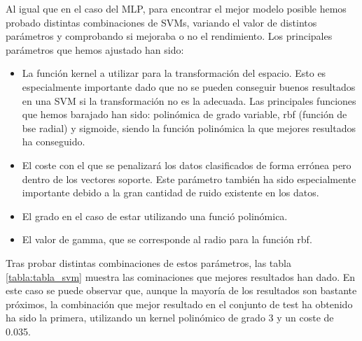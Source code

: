 \documentclass[journal,twoside]{JoPhA}
\begin{document}
	Al igual que en el caso del MLP, para encontrar el mejor modelo posible hemos probado distintas combinaciones de SVMs, variando el valor de distintos parámetros y comprobando si mejoraba o no el rendimiento. Los principales parámetros que hemos ajustado han sido: \\
	
	\begin{itemize} 
		\item La función kernel a utilizar  para la transformación del espacio. Esto es especialmente importante dado que no se pueden conseguir buenos resultados en una SVM si la transformación no es la adecuada. Las principales funciones que hemos barajado han sido: polinómica de grado variable, rbf (función de bse radial) y sigmoide, siendo la función polinómica la que mejores resultados ha conseguido. \\
		\item El coste con el que se penalizará los datos clasificados de forma errónea pero dentro de los vectores soporte. Este parámetro también ha sido especialmente importante debido a la gran cantidad de ruido existente en los datos. \\
		\item  El grado en el caso de estar utilizando una funció polinómica. \\
		\item El valor de gamma, que se corresponde al radio para la función rbf. \\
	\end{itemize} 

	Tras probar distintas combinaciones de estos parámetros, las tabla \ref{tabla:tabla_svm} muestra las cominaciones que mejores resultados han dado. En este caso se puede observar que, aunque la mayoría de los resultados son bastante próximos, la combinación que mejor resultado en el conjunto de test ha obtenido ha sido la primera, utilizando un kernel polinómico de grado 3 y un coste de 0.035.
	
\end{document}
